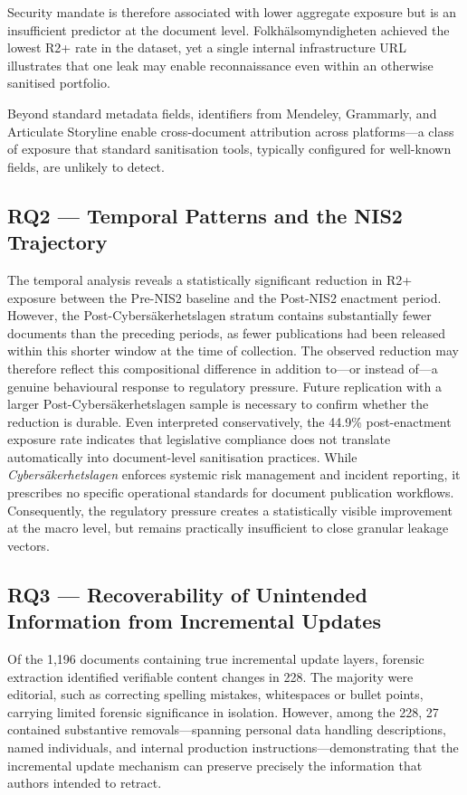 \documentclass[conference]{IEEEtran}
\begin{document}
Security mandate is therefore associated with lower aggregate exposure but is an insufficient predictor at the document level. Folkhälsomyndigheten achieved the lowest R2+ rate in the dataset, yet a single internal infrastructure URL illustrates that one leak may enable reconnaissance even within an otherwise sanitised portfolio.

Beyond standard metadata fields, identifiers from Mendeley, Grammarly, and Articulate Storyline enable cross-document attribution across platforms---a class of exposure that standard sanitisation tools, typically configured for well-known fields, are unlikely to detect.

\subsection{RQ2 --- Temporal Patterns and the NIS2 Trajectory}
The temporal analysis reveals a statistically significant reduction in R2+ exposure between the Pre-NIS2 baseline and the Post-NIS2 enactment period. However, the Post-Cybers\"{a}kerhetslagen stratum contains substantially fewer documents than the preceding periods, as fewer publications had been released within this shorter window at the time of collection. The observed reduction may therefore reflect this compositional difference in addition to---or instead of---a genuine behavioural response to regulatory pressure. Future replication with a larger Post-Cybers\"{a}kerhetslagen sample is necessary to confirm whether the reduction is durable.
Even interpreted conservatively, the 44.9\% post-enactment exposure rate indicates that legislative compliance does not translate automatically into document-level sanitisation practices. While \textit{Cybers\"{a}kerhetslagen} enforces systemic risk management and incident reporting, it prescribes no specific operational standards for document publication workflows. Consequently, the regulatory pressure creates a statistically visible improvement at the macro level, but remains practically insufficient to close granular leakage vectors.

\subsection{RQ3 --- Recoverability of Unintended Information from Incremental Updates}
Of the 1,196 documents containing true incremental update layers, forensic extraction identified verifiable content changes in 228. The majority were editorial, such as correcting spelling mistakes, whitespaces or bullet points, carrying limited forensic significance in isolation. However, among the 228, 27 contained substantive removals---spanning personal data handling descriptions, named individuals, and internal production instructions---demonstrating that the incremental update mechanism can preserve precisely the information that authors intended to retract.
\end{document}

